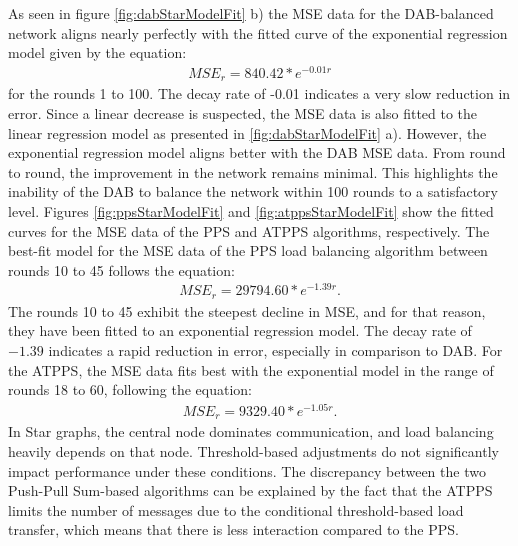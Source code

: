 As seen in figure \ref{fig:dabStarModelFit} b) the MSE data for the DAB-balanced network aligns nearly perfectly with the fitted curve of the exponential regression model given by the equation:
\begin{align}
    MSE_r=840.42*e^{-0.01r}    
\end{align}
for the rounds 1 to 100. The decay rate of -0.01 indicates a very slow reduction in error. Since a linear decrease is suspected, the MSE data is also fitted to the linear regression model as presented in \ref{fig:dabStarModelFit} a). However, the exponential regression model aligns better with the DAB MSE data. From round to round, the improvement in the network remains minimal. This highlights the inability of the DAB to balance the network within 100 rounds to a satisfactory level. Figures \ref{fig:ppsStarModelFit} and \ref{fig:atppsStarModelFit} show the fitted curves for the MSE data of the PPS and ATPPS algorithms, respectively. The best-fit model for the MSE data of the PPS load balancing algorithm between rounds 10 to 45 follows the equation:
\begin{align}
    MSE_r=29794.60*e^{-1.39r}.    
\end{align}
The rounds 10 to 45 exhibit the steepest decline in MSE, and for that reason, they have been fitted to an exponential regression model. The decay rate of $-1.39$ indicates a rapid reduction in error, especially in comparison to DAB. For the ATPPS, the MSE data fits best with the exponential model in the range of rounds 18 to 60, following the equation:
\begin{align}
    MSE_r=9329.40*e^{-1.05r}.    
\end{align}
In Star graphs, the central node dominates communication, and load balancing heavily depends on that node. Threshold-based adjustments do not significantly impact performance under these conditions. The discrepancy between the two Push-Pull Sum-based algorithms can be explained by the fact that the ATPPS limits the number of messages due to the conditional threshold-based load transfer, which means that there is less interaction compared to the PPS.

